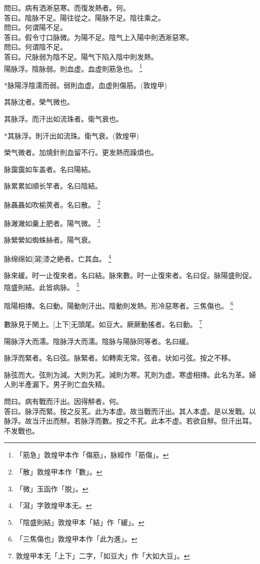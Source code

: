 \documentclass[12pt,oneside,UTF8,b5paper]{ctexbook}她她她她她她她
\begin{document}
問曰。病有洒淅惡寒。而復发熱者。何。\\
答曰。陰脉不足。陽往從之。陽脉不足。陰往乘之。\\
問曰。何谓陽不足。\\
答曰。假令寸口脉微。为陽不足。陰气上入陽中則洒淅惡寒。\\
問曰。何谓陰不足。\\
答曰。尺脉弱为陰不足。陽气下陷入陰中則发熱。\\

陽脉浮。陰脉弱。則血虚。血虚則筋急也。
	\footnote{「筋急」敦煌甲本作「傷筋」，脉經作「筋傷」。}

*脉陽浮陰濡而弱。弱則血虚。血虚則傷筋。(敦煌甲)

其脉沈者。榮气微也。

其脉浮。而汗出如流珠者。衛气衰也。

*其脉浮。則汗出如流珠。衛气衰。(敦煌甲)

榮气微者。加燒針則血留不行。更发熱而躁煩也。

脉靄靄如车盖者。名曰陽結。

脉累累如順长竿者。名曰陰結。

脉聶聶如吹榆莢者。名曰散。
	\footnote{「散」敦煌甲本作「數」。}

脉潎潎如羹上肥者。陽气微。
	\footnote{「微」玉函作「脱」。}

脉縈縈如蜘蛛絲者。陽气衰。

脉绵绵如[瀉]漆之絶者。亡其血。
	\footnote{「瀉」字敦煌甲本无。}

脉來緩。时一止復來者。名曰結。脉來數。时一止復來者。名曰促。脉陽盛則促。陰盛則結。此皆病脉。
	\footnote{「陰盛則結」敦煌甲本「結」作「緩」。}

陰陽相摶。名曰動。陽動則汗出。陰動則发熱。形冷惡寒者。三焦傷也。
	\footnote{「三焦傷也」敦煌甲本作「此为進」。}

數脉見于関上。[上下]无頭尾。如豆大。厥厥動搖者。名曰動。
	\footnote{敦煌甲本无「上下」二字，「如豆大」作「大如大豆」。}

陽脉浮大而濡。陰脉浮大而濡。陰脉与陽脉同等者。名曰緩。

脉浮而緊者。名曰弦。脉緊者。如轉索无常。弦者。状如弓弦。按之不移。

脉弦而大。弦則为減。大則为芤。減則为寒。芤則为虚。寒虚相摶。此名为革。婦人則半產漏下。男子則亡血失精。

問曰。病有戰而汗出。因得觧者。何。\\
答曰。脉浮而緊。按之反芤。此为本虚。故当戰而汗出。其人本虚。是以发戰。以脉浮。故当汗出而觧。若脉浮而數。按之不芤。此本不虚。若欲自觧。但汗出耳。不发戰也。
\end{document}
